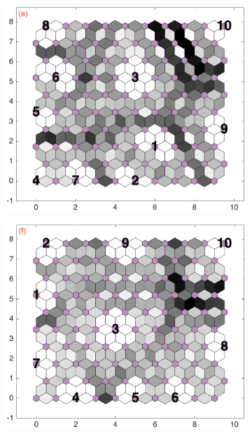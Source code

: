 \begin{figure}
\begin{subfigure}[b]{0.25\textwidth}
        \label{fig: col3and14_dist}
    \end{subfigure}
        \hfill
    \begin{subfigure}[b]{0.25\textwidth}
        \centering
        \includegraphics[width=\textwidth]{../../images0.01/M31/2D/diff_dimension/combine_2D_data_between_cols3and15.png}
        \label{fig: col3and15_dist}
    \end{subfigure}
        \hfill
    \begin{subfigure}[b]{0.25\textwidth}
        \centering
        \includegraphics[width=\textwidth]{../../images0.01/M31/2D/diff_dimension/combine_2D_data_between_cols3and16.png}

\end{subfigure}
\end{figure}
